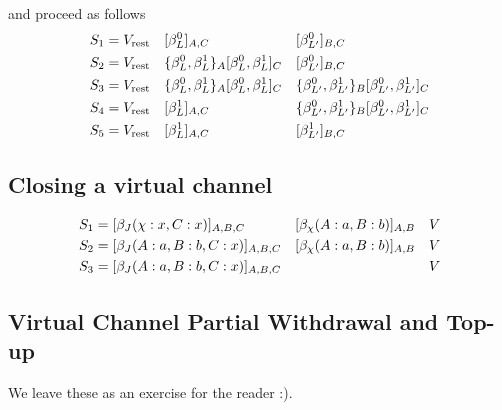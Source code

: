 and proceed as follows
\begin{align*}
S_1 &= V_\text{rest} &&[\beta_L^0]_{A, C} && [\beta_{L'}^0]_{B, C} \\
S_2 &= V_\text{rest} &&\{\beta_L^0, \beta_L^1\}_A[\beta_L^0, \beta_L^1]_C && [\beta_{L'}^0]_{B, C}\\
S_3 &= V_\text{rest} &&\{\beta_L^0, \beta_L^1\}_A[\beta_L^0, \beta_L^1]_C && \{\beta_{L'}^0, \beta_{L'}^1\}_B[\beta_{L'}^0, \beta_{L'}^1]_C \\
S_4 &= V_\text{rest} &&[\beta_L^1]_{A, C} && \{\beta_{L'}^0, \beta_{L'}^1\}_B[\beta_{L'}^0, \beta_{L'}^1]_C \\
S_5 &= V_\text{rest} &&[\beta_L^1]_{A, C} && [\beta_{L'}^1]_{B, C}
\end{align*}



\subsection{Closing a virtual channel}

\begin{align*}
S_1 &= [\beta_J(\chi: x, C: x)]_{A, B, C} && [\beta_\chi(A:a, B: b)]_{A, B} & V \\
S_2 &= [\beta_J(A: a, B: b, C: x)]_{A, B, C} && [\beta_\chi(A:a, B: b)]_{A, B} & V \\
S_3 &= [\beta_J(A: a, B: b, C: x)]_{A, B, C} && & V \\
\end{align*}

\subsection{Virtual Channel Partial Withdrawal and Top-up}

We leave these as an exercise for the reader :). 




